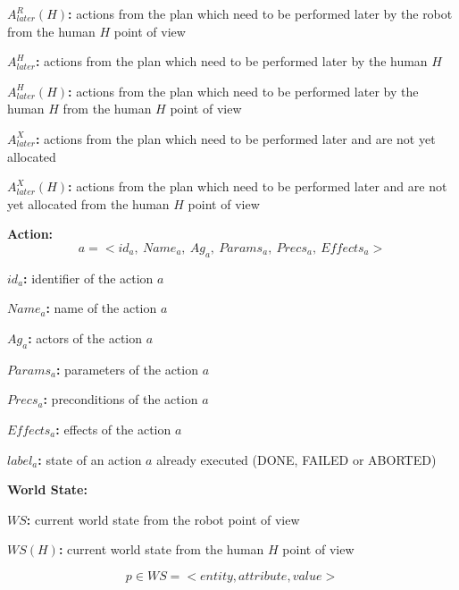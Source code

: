 \textbf{$A_{later}^R(H)$:} actions from the plan which need to be performed later by the robot from the human $H$ point of view

\textbf{$A_{later}^H$:} actions from the plan which need to be performed later by the human $H$

\textbf{$A_{later}^H(H)$:} actions from the plan which need to be performed later by the human $H$ from the human $H$ point of view

\textbf{$A_{later}^X$:} actions from the plan which need to be performed later and are not yet allocated

\textbf{$A_{later}^X(H)$:} actions from the plan which need to be performed later and are not yet allocated from the human $H$ point of view

\bigskip
\textbf{Action:}
$$a = < id_{a}, \ Name_{a}, \ Ag_{a}, \ Params_{a}, \ Precs_{a}, \ Effects_{a} >$$

\textbf{$id_{a}$:} identifier of the action $a$

\textbf{$Name_{a}$:} name of the action $a$

\textbf{$Ag_{a}$:} actors of the action $a$

\textbf{$Params_{a}$:} parameters of the action $a$

\textbf{$Precs_{a}$:} preconditions of the action $a$

\textbf{$Effects_{a}$:} effects of the action $a$

\textbf{$label_{a}$:} state of an action $a$ already executed (DONE, FAILED or ABORTED)

\bigskip
\textbf{World State:}

\textbf{$WS$:} current world state from the robot point of view

\textbf{$WS(H)$:} current world state from the human $H$ point of view

$$p \in WS = <entity, attribute, value>$$

